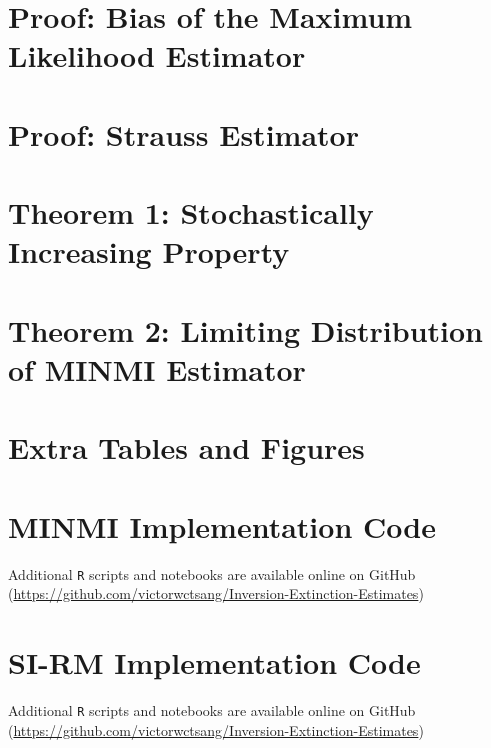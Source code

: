 \documentclass[honours,12pt]{UNSWthesis}
\begin{document}


\appendix

\chapter{Proof: Bias of the Maximum Likelihood Estimator}\label{apx:mle-bias-proof}


\chapter{Proof: Strauss Estimator}\label{apx:strauss-estimator-proof}


\chapter{Theorem 1: Stochastically Increasing Property}\label{apx:minmi-stoch-incr-proof}


\chapter{Theorem 2: Limiting Distribution of MINMI Estimator}\label{apx:minmi-asymptotics-proof}


\chapter{Extra Tables and Figures}\label{apx:extra-tables-figures}


\chapter{MINMI Implementation Code}\label{apx:code-minmi}
Additional \texttt{R} scripts and notebooks are available online on GitHub (\url{https://github.com/victorwctsang/Inversion-Extinction-Estimates})



\chapter{SI-RM Implementation Code}\label{apx:code-si-rm}
Additional \texttt{R} scripts and notebooks are available online on GitHub (\url{https://github.com/victorwctsang/Inversion-Extinction-Estimates})
\end{document}
